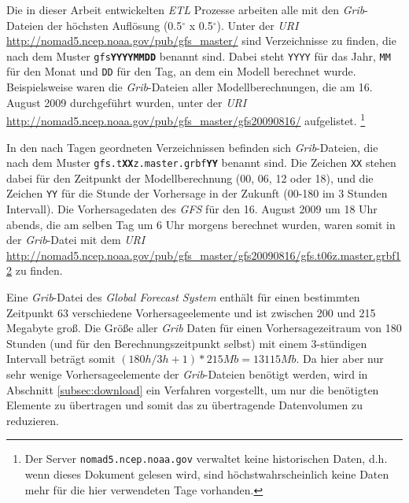 Die in dieser Arbeit entwickelten \textit{ETL} Prozesse arbeiten alle
mit den \textit{Grib}-Dateien der höchsten Auflösung (0.5$^{\circ}$ x
0.5$^{\circ}$). Unter der \textit{URI}
\url{http://nomad5.ncep.noaa.gov/pub/gfs_master/} sind Verzeichnisse
zu finden, die nach dem Muster \texttt{gfs\textbf{YYYYMMDD}} benannt
sind. Dabei steht \texttt{YYYY} für das Jahr, \texttt{MM} für den
Monat und \texttt{DD} für den Tag, an dem ein Modell berechnet
wurde. Beispielsweise waren die \textit{Grib}-Dateien aller
Modellberechnungen, die am 16. August 2009 durchgeführt wurden, unter
der \textit{URI}
\url{http://nomad5.ncep.noaa.gov/pub/gfs_master/gfs20090816/}
aufgelistet.  \footnote{Der Server \texttt{nomad5.ncep.noaa.gov}
  verwaltet keine historischen Daten, d.h. wenn dieses Dokument
  gelesen wird, sind höchstwahrscheinlich keine Daten mehr für die
  hier verwendeten Tage vorhanden.}

In den nach Tagen geordneten Verzeichnissen befinden sich
\textit{Grib}-Dateien, die nach dem Muster
\texttt{gfs.t\textbf{XX}z.master.grbf\textbf{YY}} benannt sind. Die
Zeichen \texttt{XX} stehen dabei für den Zeitpunkt der
Modellberechnung (00, 06, 12 oder 18), und die Zeichen \texttt{YY} für
die Stunde der Vorhersage in der Zukunft (00-180 im 3 Stunden
Intervall). Die Vorhersagedaten des \textit{GFS} für den 16. August
2009 um 18 Uhr abends, die am selben Tag um 6 Uhr morgens berechnet
wurden, waren somit in der \textit{Grib}-Datei mit dem \textit{URI}
\url{http://nomad5.ncep.noaa.gov/pub/gfs_master/gfs20090816/gfs.t06z.master.grbf12}
zu finden.

Eine \textit{Grib}-Datei des \textit{Global Forecast System} enthält
für einen bestimmten Zeitpunkt 63 verschiedene Vorhersageelemente und
ist zwischen 200 und 215 Megabyte groß. Die Größe aller \textit{Grib}
Daten für einen Vorhersagezeitraum von 180 Stunden (und für den
Berechnungszeitpunkt selbst) mit einem 3-stündigen Intervall beträgt
somit $(180h / 3h + 1) * 215 Mb = 13115 Mb$. Da hier aber nur sehr
wenige Vorhersageelemente der \textit{Grib}-Dateien benötigt werden,
wird in Abschnitt \ref{subsec:download} ein Verfahren vorgestellt, um
nur die benötigten Elemente zu übertragen und somit das zu
übertragende Datenvolumen zu reduzieren.

